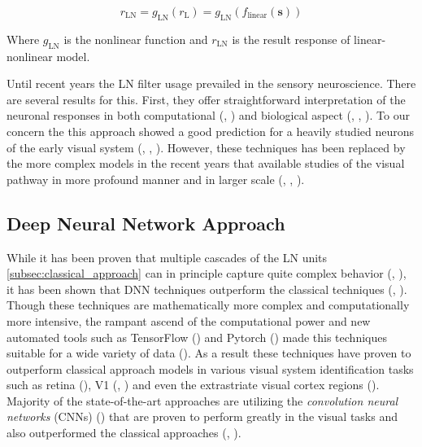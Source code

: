 $$r_{\text{LN}} = g_{\text{LN}}(r_{\text{L}}) = g_{\text{LN}}(f_{\text{linear}}(\boldsymbol{s}))$$

Where $g_{\text{LN}}$ is the nonlinear function and $r_{\text{LN}}$ is the result response of linear-nonlinear model.

Until recent years the LN filter usage prevailed in the sensory neuroscience. There are several results for this. First, they offer straightforward interpretation of the neuronal responses in both computational (\citet{hubel1965receptive}, \citet{movshon1978receptive}) and biological aspect (\citet{mohanty2012membrane}, \citet{SHAPLEY2009907}, \citet{poirazi2003pyramidal}). To our concern the this approach showed a good prediction for a heavily studied neurons of the early visual system (\citet{SHAPLEY2009907}, \citet{baccus2002fast}, \citet{Carandini10577}). However, these techniques has been replaced by the more complex models in the recent years that available studies of the visual pathway in more profound manner and in larger scale (\citet{Maheswaranathan340943}, \citet{Butts11313}, \citet{keat2001predicting}).

\subsection{Deep Neural Network Approach}
\label{subsec:deep_learning_approach}
While it has been proven that multiple cascades of the LN units \ref{subsec:classical_approach} can in principle capture quite complex behavior (\citet{cybenko1989approximation}, \citet{HORNIK1991251}), it has been shown that DNN techniques outperform the classical techniques (\citet{MAL-006}, \citet{Kriegeskorte2015dnn}). Though these techniques are mathematically more complex and computationally more intensive, the rampant ascend of the computational power and new automated tools such as TensorFlow (\citet{TensorFlow}) and Pytorch (\citet{paszke2017automatic}) made this techniques suitable for a wide variety of data (\citet{lecun2015deep}). As a result these techniques have proven to outperform classical approach models in various visual system identification tasks such as retina (\citet{Maheswaranathan340943}), V1 (\citet{cadena2019conv}, \citet{kindel2017usingdeeplearningreveal}) and even the extrastriate visual cortex regions (\citet{zareh2024deep}). Majority of the state-of-the-art approaches are utilizing the \emph{convolution neural networks} (CNNs) (\citet{NIPS2012_c399862d}) that are proven to perform greatly in the visual tasks and also outperformed the classical approaches (\citet{zhang2019convolutional}, \citet{cadena2019conv}).

